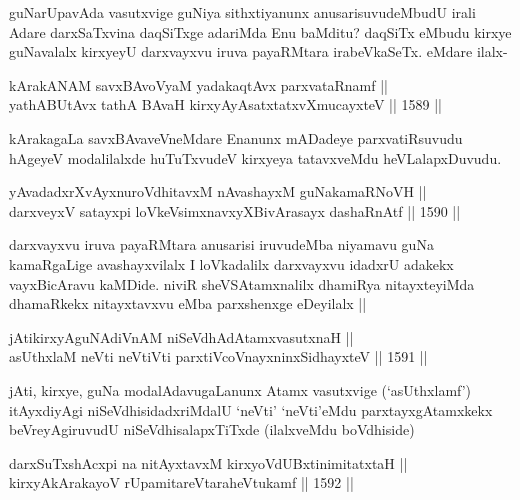 \begin{artha}
guNarUpavAda vasutxvige guNiya sithxtiyanunx anusarisuvudeMbudU irali Adare darxSaTxvina daqSiTxge adariMda Enu baMditu? daqSiTx eMbudu kirxye guNavalalx kirxyeyU darxvayxvu iruva payaRMtara irabeVkaSeTx. eMdare ilalx-
\end{artha}

\begin{shl}
kArakANAM savxBAvoV\s yaM yadakaqtAvx parxvataRnamf || \\
yathA\s BUtAvx tathA BAvaH kirxyAyAsatxtatxvXmucayxteV \hfill || 1589 ||  
\end{shl}

\begin{artha}
kArakagaLa savxBAvaveVneMdare Enanunx mADadeye parxvatiRsuvudu hAgeyeV modalilalxde huTuTxvudeV kirxyeya tatavxveMdu heVLalapxDuvudu.
\end{artha}

\begin{shl}
yAvadadxrXvAyxnuroVdhitavxM nAvashayxM guNakamaRNoVH || \\
darxveyxV satayxpi loVkeV\s simxnavxyXBivArasayx dashaRnAtf \hfill || 1590 ||  
\end{shl}

\begin{artha}
darxvayxvu iruva payaRMtara anusarisi iruvudeMba niyamavu guNa kamaRgaLige avashayxvilalx I loVkadalilx darxvayxvu idadxrU adakekx vayxBicAravu kaMDide. niviR sheVSAtamxnalilx dhamiRya nitayxteyiMda dhamaRkekx nitayxtavxvu eMba parxshenxge eDeyilalx ||
\end{artha}

\begin{shl}
jAtikirxyAguNAdiVnAM niSeVdhAdAtamxvasutxnaH || \\
asUthxlaM neVti neVtiVti parxtiVcoV\s nayxninxSidhayxteV \hfill || 1591 || 
\end{shl}

\begin{artha}
jAti, kirxye, guNa modalAdavugaLanunx Atamx vasutxvige (`asUthxlamf') itAyxdiyAgi niSeVdhisidadxriMdalU `neVti' `neVti'eMdu parxtayxgAtamxkekx beVreyAgiruvudU niSeVdhisalapxTiTxde (ilalxveMdu boVdhiside) 
\end{artha}


\begin{shl}
darxSuTxshAcxpi na nitAyxtavxM kirxyoVdUBxtinimitatxtaH || \\
kirxyAkArakayoV rUpamitareVtaraheVtukamf \hfill || 1592 ||  
\end{shl}

